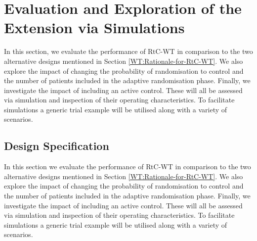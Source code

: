  \section{Evaluation and Exploration of the Extension via Simulations}
 \label{WT:Evaluation-of-the-Extension}
 
 In this section, we evaluate the performance of RtC-WT in comparison to the two alternative designs mentioned in Section \ref{WT:Rationale-for-RtC-WT}. We also explore the impact of changing the probability of randomisation to control and the number of patients included in the adaptive randomisation phase. Finally, we investigate the impact of including an active control. These will all be assessed via simulation and inspection of their operating characteristics. To facilitate simulations a generic trial example will be utilised along with a variety of scenarios. 
 
 \subsection{Design Specification}
 \label{WT:Design-Spec}
 
 In this section we evaluate the performance of RtC-WT in comparison to the two alternative designs mentioned in Section \ref{WT:Rationale-for-RtC-WT}. We also explore the impact of changing the probability of randomisation to control and the number of patients included in the adaptive randomisation phase. Finally, we investigate the impact of including an active control. These will all be assessed via simulation and inspection of their operating characteristics. To facilitate simulations a generic trial example will be utilised along with a variety of scenarios. 
 


